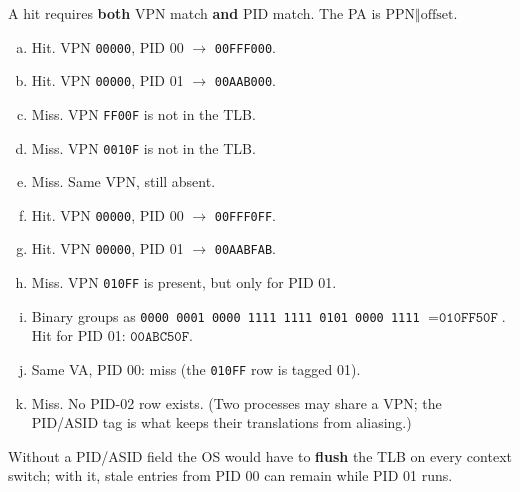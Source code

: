 \documentclass[11pt,a4paper]{article}
\newenvironment{Sol}{%
  \begin{tcolorbox}[sboxstyle, title={Solution}]%
}{%
  \end{tcolorbox}\vspace{0.35em}%
}
\begin{document}
\begin{Sol}
A hit requires \textbf{both} VPN match \textbf{and} PID match. The PA is
$\mathrm{PPN}\Vert\mathrm{offset}$.
\begin{enumerate}[(a)]
\item Hit. VPN \texttt{00000}, PID 00 $\to$ \texttt{00FFF000}.
\item Hit. VPN \texttt{00000}, PID 01 $\to$ \texttt{00AAB000}.
\item Miss. VPN \texttt{FF00F} is not in the TLB.
\item Miss. VPN \texttt{0010F} is not in the TLB.
\item Miss. Same VPN, still absent.
\item Hit. VPN \texttt{00000}, PID 00 $\to$ \texttt{00FFF0FF}.
\item Hit. VPN \texttt{00000}, PID 01 $\to$ \texttt{00AABFAB}.
\item Miss. VPN \texttt{010FF} is present, but only for PID 01.
\item Binary groups as \texttt{0000\,0001\,0000\,1111\,1111\,0101\,0000\,1111}
      $= \texttt{010FF50F}$. Hit for PID 01: $\texttt{00ABC50F}$.
\item Same VA, PID 00: miss (the \texttt{010FF} row is tagged 01).
\item Miss. No PID-02 row exists. (Two processes may share a VPN; the
      PID/ASID tag is what keeps their translations from aliasing.)
\end{enumerate}
Without a PID/ASID field the OS would have to \textbf{flush} the TLB on
every context switch; with it, stale entries from PID 00 can remain
while PID 01 runs.
\end{Sol}
\end{document}
